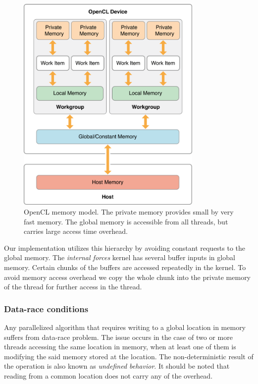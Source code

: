   \begin{figure}
    \centering
      \includegraphics[width=90mm]{sections/methodology/images/gpu/opencl_memory_hierarchy.png}
    \caption{\label{gpu_opencl_memory_hierarchy} OpenCL memory model. The private memory provides small by very fast memory. The global memory is accessible from all threads, but carries large access time overhead.}
  \end{figure}

  Our implementation utilizes this hierarchy by avoiding constant requests to the global memory. The \textit{internal forces} kernel has several buffer inputs in global memory. Certain chunks of the buffers are accessed repeatedly in the kernel. To avoid memory access overhead we copy the whole chunk into the private memory of the thread for further access in the thread.

  \subsubsection{Data-race conditions}

  Any parallelized algorithm that requires writing to a global location in memory suffers from data-race problem. The issue occurs in the case of two or more threads accessing the same location in memory, when at least one of them is modifying the said memory stored at the location. The non-deterministic result of the operation is also known as \textit{undefined behavior}. It should be noted that reading from a common location does not carry any of the overhead.

